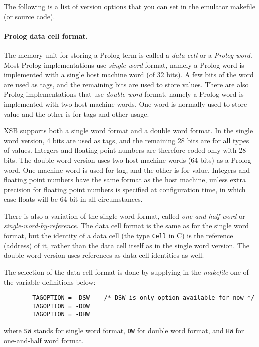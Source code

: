 \documentclass[11pt]{article}
\begin{document}
The following is a list of version options that you can set in the
emulator makefile (or source code).

\paragraph{Prolog data cell format. }
The memory unit for storing a Prolog term is called a {\it
data cell} or a {\it Prolog word}. Most Prolog implementations
use {\it single word} format, namely a Prolog word is implemented
with a single host machine word (of 32 bits). A few bits
of the word are used as tags, and the remaining bits are used
to store values. There are also Prolog implementations that use
{\it double word} format, namely a Prolog word is implemented
with two host machine words. One word is normally used to store 
value and the other is for tags and other usage.

XSB supports both a single word format and a double word
format.  In the single word version, 4 bits are used as tags, and the
remaining 28 bits are for all types of values. Integers and
floating point numbers are therefore coded only with 28 bits. The
double word version uses two host machine words (64 bits) as a Prolog
word. One machine word is used for tag, and the other is for value.
Integers and floating point numbers have the same format as the host
machine, unless extra precision for floating point numbers is specified at
configuration time, in which case floats will be 64 bit in all circumstances.

There is also a variation of the single word format, called {\it
one-and-half-word} or {\it single-word-by-reference}. 
The data cell format is the same as for the single word format,
but the identity of a data cell (the type {\tt Cell} in C) is the
reference (address) of it, rather than the data cell itself as in
the single word version. The double word version uses references
as data cell identities as well.

The selection of the data cell format is done by supplying 
in the {\it makefile} one of the variable definitions below:

\begin{verbatim}
        TAGOPTION = -DSW 	/* DSW is only option available for now */
        TAGOPTION = -DDW
        TAGOPTION = -DHW
\end{verbatim}

where {\tt SW} stands for single word format, {\tt DW} for double word
format, and {\tt HW} for one-and-half word format.
\end{document}
